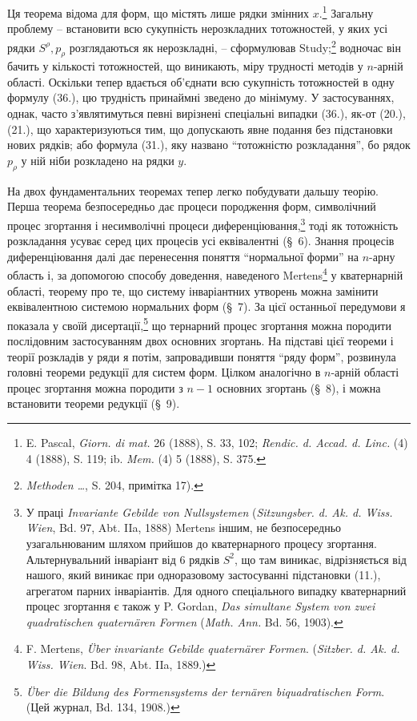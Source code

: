 \documentclass[11pt]{article}
\begin{document}
Ця теорема відома для форм, що містять лише рядки змінних $x$.\footnote{E. Pascal, \emph{Giorn. di mat.} 26 (1888), S. 33, 102; \emph{Rendic. d. Accad. d. Linc.} (4) 4 (1888), S. 119; ib. \emph{Mem.} (4) 5 (1888), S. 375.} Загальну проблему -- встановити всю сукупність нерозкладних тотожностей, у яких усі рядки $S^\rho,p_\rho$ розглядаються як нерозкладні, -- сформулював Study;\footnote{\emph{Methoden \dots}, S. 204, примітка 17).} водночас він бачить у кількості тотожностей, що виникають, міру трудності методів у $n$-арній області. Оскільки тепер вдається об'єднати всю сукупність тотожностей в одну формулу (36.), цю трудність принаймні зведено до мінімуму. У застосуваннях, однак, часто з'являтимуться певні вирізнені спеціальні випадки (36.), як-от (20.), (21.), що характеризуються тим, що допускають явне подання без підстановки нових рядків; або формула (31.), яку названо ``тотожністю розкладання'', бо рядок $p_\rho$ у ній ніби розкладено на рядки $y$.

На двох фундаментальних теоремах тепер легко побудувати дальшу теорію. Перша теорема безпосередньо дає процеси породження форм, символічний процес згортання і несимволічні процеси диференціювання,\footnote{У праці \emph{Invariante Gebilde von Nullsystemen} (\emph{Sitzungsber. d. Ak. d. Wiss. Wien}, Bd. 97, Abt. IIa, 1888) Mertens іншим, не безпосередньо узагальнюваним шляхом прийшов до кватернарного процесу згортання. Альтернувальний інваріант від 6 рядків $S^2$, що там виникає, відрізняється від нашого, який виникає при одноразовому застосуванні підстановки (11.), агрегатом парних інваріантів. Для одного спеціального випадку кватернарний процес згортання є також у P. Gordan, \emph{Das simultane System von zwei quadratischen quaternären Formen} (\emph{Math. Ann.} Bd. 56, 1903).} тоді як тотожність розкладання усуває серед цих процесів усі еквівалентні (\S\ 6). Знання процесів диференціювання далі дає перенесення поняття ``нормальної форми'' на $n$-арну область і, за допомогою способу доведення, наведеного Mertens\footnote{F. Mertens, \emph{Über invariante Gebilde quaternärer Formen}. (\emph{Sitzber. d. Ak. d. Wiss. Wien}. Bd. 98, Abt. IIa, 1889.)} у кватернарній області, теорему про те, що систему інваріантних утворень можна замінити еквівалентною системою нормальних форм (\S\ 7). За цієї останньої передумови я показала у своїй дисертації,\footnote{\emph{Über die Bildung des Formensystems der ternären biquadratischen Form}. (Цей журнал, Bd. 134, 1908.)} що тернарний процес згортання можна породити послідовним застосуванням двох основних згортань. На підставі цієї теореми і теорії розкладів у ряди я потім, запровадивши поняття ``ряду форм'', розвинула головні теореми редукції для систем форм. Цілком аналогічно в $n$-арній області процес згортання можна породити з $n-1$ основних згортань (\S\ 8), і можна встановити теореми редукції (\S\ 9).
\end{document}
